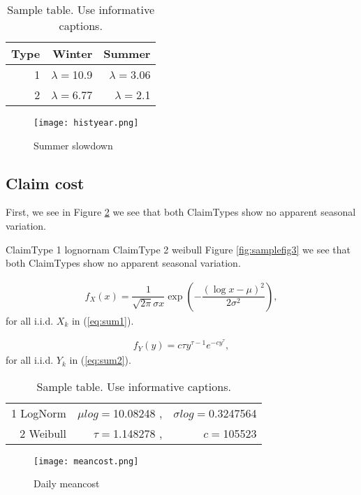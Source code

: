 \documentclass[11pt]{article}
\begin{document}
\begin{table}[!ht]
\center
\begin{tabular}{r|rr}
Type & Winter & Summer \\ 
\hline
1 & $\lambda=$10.9 & $\lambda=$3.06 \\
2 & $\lambda=$6.77 & $\lambda=$2.1\\
\hline
\end{tabular}
\caption{Sample table. Use informative captions.} \label{tab:sampletab}
\end{table}

 \begin{figure}[H]
 \center
  \texttt{[image: histyear.png]}
  \caption{Summer slowdown}
  \label{fig:samplefig1}
\end{figure}


\subsection*{Claim cost}
First,  we see in Figure \ref{fig:samplefig2} we see that both ClaimTypes show no apparent seasonal variation.

ClaimType 1 lognornam
ClaimType 2 weibull
 Figure \ref{fig:samplefig3} we see that both ClaimTypes show no apparent seasonal variation.

\begin{align}\label{eq:N}
	f_{X}(x) = \dfrac{1}{\sqrt{2\pi}\sigma x} \exp\left(-\dfrac{(\log x - \mu)^2}{2\sigma^2}\right) , 
\end{align}
for all i.i.d. $X_k$ in (\ref{eq:sum1}).

\begin{align}\label{eq:N}
	f_{Y}(y) = c \tau y^{\tau - 1}e^{-cy^\tau} , 
\end{align}
for all i.i.d. $Y_k$ in (\ref{eq:sum2}).

\begin{table}[!ht]
\center
\begin{tabular}{|r|rr|}
\hline
1 LogNorm & $\mu log=$10.08248 ,& $\sigma log=$0.3247564 \\
2 Weibull & $\tau=$1.148278 ,& $c=$105523\\
\hline
\end{tabular}
\caption{Sample table. Use informative captions.} \label{tab:cost}
\end{table}

 \begin{figure}[H]
 \center
  \texttt{[image: meancost.png]}
  \caption{Daily meancost}
  \label{fig:samplefig2}
\end{figure}
\end{document}
